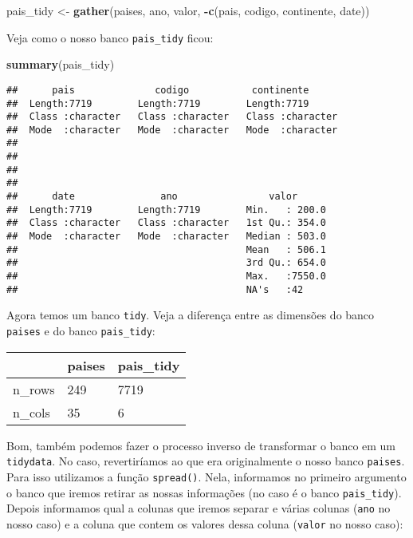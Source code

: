 \documentclass[]{book}
\newenvironment{Shaded}{\begin{snugshade}}{\end{snugshade}}
\newcommand{\KeywordTok}[1]{\textcolor[rgb]{0.13,0.29,0.53}{\textbf{#1}}}
\newcommand{\NormalTok}[1]{#1}
\newcommand{\OperatorTok}[1]{\textcolor[rgb]{0.81,0.36,0.00}{\textbf{#1}}}
\newcommand{\StringTok}[1]{\textcolor[rgb]{0.31,0.60,0.02}{#1}}
\theoremstyle{definition}
\theoremstyle{definition}
\theoremstyle{definition}
\theoremstyle{remark}
\begin{document}
\begin{Shaded}
\begin{Highlighting}[]
\NormalTok{pais_tidy <-}\StringTok{ }\KeywordTok{gather}\NormalTok{(paises, ano, valor, }\OperatorTok{-}\KeywordTok{c}\NormalTok{(pais, codigo, continente, date))}
\end{Highlighting}
\end{Shaded}

Veja como o nosso banco \texttt{pais\_tidy} ficou:

\begin{Shaded}
\begin{Highlighting}[]
\KeywordTok{summary}\NormalTok{(pais_tidy)}
\end{Highlighting}
\end{Shaded}

\begin{verbatim}
##      pais              codigo           continente       
##  Length:7719        Length:7719        Length:7719       
##  Class :character   Class :character   Class :character  
##  Mode  :character   Mode  :character   Mode  :character  
##                                                          
##                                                          
##                                                          
##                                                          
##      date               ano                valor       
##  Length:7719        Length:7719        Min.   : 200.0  
##  Class :character   Class :character   1st Qu.: 354.0  
##  Mode  :character   Mode  :character   Median : 503.0  
##                                        Mean   : 506.1  
##                                        3rd Qu.: 654.0  
##                                        Max.   :7550.0  
##                                        NA's   :42
\end{verbatim}

Agora temos um banco \texttt{tidy}. Veja a diferença entre as dimensões do banco \texttt{paises} e do banco \texttt{pais\_tidy}:

\begin{tabular}{l|l|l}
\hline
  & paises & pais\_tidy\\
\hline
n\_rows & 249 & 7719\\
\hline
n\_cols & 35 & 6\\
\hline
\end{tabular}

Bom, também podemos fazer o processo inverso de transformar o banco em um \texttt{tidydata}. No caso, revertiríamos ao que era originalmente o nosso banco \texttt{paises}. Para isso utilizamos a função \texttt{spread()}. Nela, informamos no primeiro argumento o banco que iremos retirar as nossas informações (no caso é o banco \texttt{pais\_tidy}). Depois informamos qual a colunas que iremos separar e várias colunas (\texttt{ano} no nosso caso) e a coluna que contem os valores dessa coluna (\texttt{valor} no nosso caso):
\end{document}

